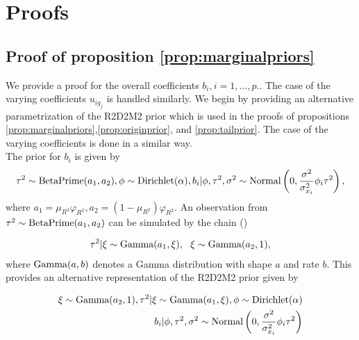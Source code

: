 \section{Proofs}
\label{appendixA}


\subsection*{Proof of proposition \ref{prop:marginalpriors}}

We provide a proof for the overall coefficients $b_i, i=1,...,p.$. The case of the varying coefficients $u_{ig_j}$ is handled similarly. We begin by providing an alternative parametrization of the R2D2M2 prior which is used in the proofs of propositions  \ref{prop:marginalpriors},\ref{prop:originprior}, and \ref{prop:tailprior}. The case of the varying coefficients is done in a similar way. \\

The prior for $b_i$ is  given by
	\begin{align}
	\tau^2 \sim \text{BetaPrime} (a_1, a_2),  \phi \sim \text{Dirichlet} (\alpha), b_i| \phi, \tau^2,\sigma^2 \sim \text{Normal} \left(0, \frac{\sigma^2}{\sigma_{x_i}^2} \phi_i \tau^2  \right),
	\end{align}
	where $a_1=\mu_{R^2}\varphi_{R^2}, a_2=(1-\mu_{R^2})\varphi_{R^2}$. An observation from $\tau^2 \sim \text{BetaPrime} (a_1, a_2)$ can be simulated by the chain (\cite{r2d2zhang})

	\begin{align*}
		\tau^2 | \xi \sim \text{Gamma} (a_1, \xi), \ \
		\xi \sim \text{Gamma}(a_2, 1) ,
	\end{align*}
	where $\text{Gamma}(a,b)$ denotes a Gamma distribution with shape $a$ and rate $b$. This provides an alternative representation of the R2D2M2 prior given by

	\begin{equation}
	\label{eq:r2d2altparam1}
	\begin{aligned}
	\xi \sim \text{Gamma}(a_2, 1) , \tau^2 | \xi \sim \text{Gamma} (a_1, \xi),  \phi \sim \text{Dirichlet} (\alpha) \\
	b_i| \phi, \tau^2,\sigma^2 \sim \text{Normal} \left(0, \frac{\sigma^2}{\sigma_{x_i}^2} \phi_i \tau^2  \right)
	\end{aligned}
	\end{equation}

